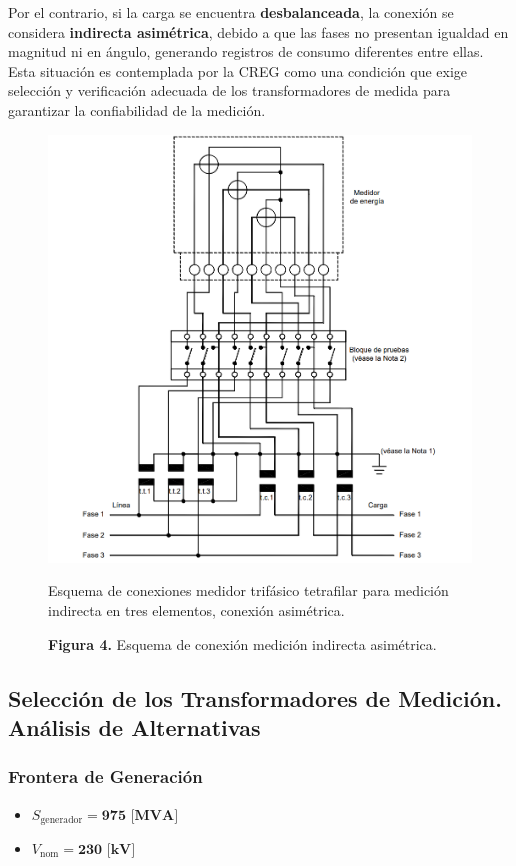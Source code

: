 Por el contrario, si la carga se encuentra \textbf{desbalanceada}, la conexión se considera \textbf{indirecta asimétrica}, debido a que las fases no presentan igualdad en magnitud ni en ángulo, generando registros de consumo diferentes entre ellas. Esta situación es contemplada por la CREG como una condición que exige selección y verificación adecuada de los transformadores de medida para garantizar la confiabilidad de la medición.

\begin{figure}[t]
    \centering
    \includegraphics[width=\columnwidth]{figs/figura_esquema_asimetrico.png}
    \caption{Esquema de conexiones medidor trifásico tetrafilar para medición indirecta en tres elementos, conexión asimétrica.}
    \label{fig:esquema_asimetrico}
    \caption*{\textbf{Figura 4.} Esquema de conexión medición indirecta asimétrica.}
\end{figure}

\subsection{Selección de los Transformadores de Medición. Análisis de Alternativas} \label{subsec:seleccion_transformadores}
\subsubsection{Frontera de Generación}
\begin{itemize}
    \item $S_{\text{generador}} = \mathbf{975 \text{ [MVA]}}$
    \item $V_{\text{nom}} = \mathbf{230 \text{ [kV]}}$
\end{itemize}

